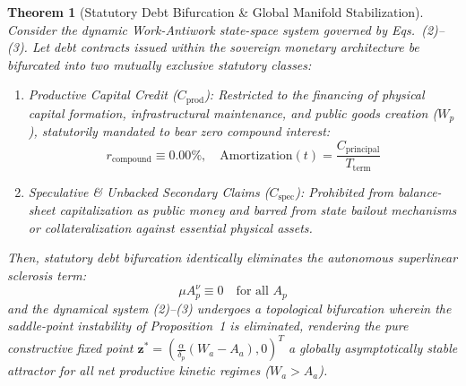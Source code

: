 \documentclass[preprint,12pt,authoryear]{elsarticle}
\newtheorem{theorem}{Theorem}
\theoremstyle{definition}
\begin{document}
\begin{theorem}[Statutory Debt Bifurcation \& Global Manifold Stabilization]
Consider the dynamic Work-Antiwork state-space system governed by Eqs.~(2)--(3). Let debt contracts issued within the sovereign monetary architecture be bifurcated into two mutually exclusive statutory classes:
\begin{enumerate}
\item Productive Capital Credit ($C_{\text{prod}}$): Restricted to the financing of physical capital formation, infrastructural maintenance, and public goods creation ($W_p$), statutorily mandated to bear zero compound interest:
\begin{equation}
r_{\text{compound}} \equiv 0.00\%, \quad \text{Amortization}(t) = \frac{C_{\text{principal}}}{T_{\text{term}}} \label{eq:theorem5_amortization}
\end{equation}
\item Speculative \& Unbacked Secondary Claims ($C_{\text{spec}}$): Prohibited from balance-sheet capitalization as public money and barred from state bailout mechanisms or collateralization against essential physical assets.
\end{enumerate}
Then, statutory debt bifurcation identically eliminates the autonomous superlinear sclerosis term:
\begin{equation}
\mu A_p^\nu \equiv 0 \quad \text{for all } A_p \label{eq:theorem5_elimination}
\end{equation}
and the dynamical system (2)--(3) undergoes a topological bifurcation wherein the saddle-point instability of Proposition~1 is eliminated, rendering the pure constructive fixed point $\mathbf{z}^* = \left(\frac{\alpha}{\delta_p}(W_a - A_a), 0\right)^T$ a globally asymptotically stable attractor for all net productive kinetic regimes ($W_a > A_a$).
\end{theorem}
\end{document}

